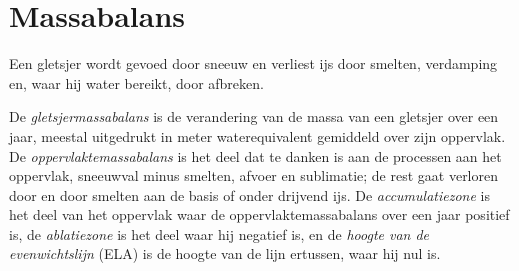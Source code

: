 \section{Massabalans}\label{sec:b3:glaciology:mass-balance}

Een gletsjer wordt gevoed door sneeuw en verliest ijs door smelten, verdamping en, waar hij
water bereikt, door afbreken.

\begin{definition}\label{def:b3:glaciology:mass-balance}
De \emph{gletsjermassabalans} is de verandering
van de massa van een gletsjer over een jaar, meestal uitgedrukt in meter
waterequivalent gemiddeld over zijn oppervlak. De
\emph{oppervlaktemassabalans} is het deel dat te danken is aan de processen
aan het oppervlak, sneeuwval minus smelten, afvoer en sublimatie; de rest gaat verloren
door  en door smelten aan de basis of onder drijvend ijs. De
\emph{accumulatiezone} is het deel van het
oppervlak waar de oppervlaktemassabalans over een jaar positief is, de
\emph{ablatiezone} is het deel waar hij negatief is, en
de \emph{hoogte van de evenwichtslijn}
(ELA) is de hoogte van de lijn ertussen, waar hij nul is.
\end{definition}

